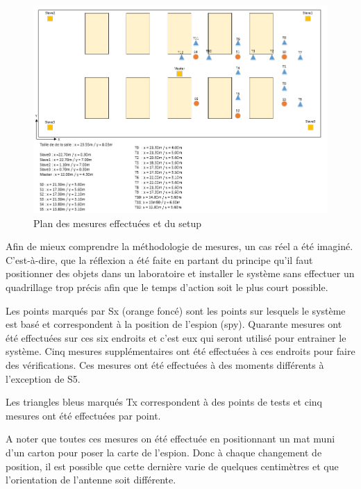 \begin{figure}[htp]
	\begin{center}
		\includegraphics[scale=0.7]{figures/mesures.png}
		\caption{Plan des mesures effectuées et du setup}
		\label{fig:mesures} %
	\end{center}
\end{figure}

Afin de mieux comprendre la méthodologie de mesures, un cas réel a été imaginé. C'est-à-dire, que la réflexion a été faite en partant du principe qu'il faut positionner des objets dans un laboratoire et installer le système sans effectuer un quadrillage trop précis afin que le temps d'action soit le plus court possible. 

Les points marqués par Sx (orange foncé) sont les points sur lesquels le système est basé et correspondent à la position de l'espion (spy). Quarante mesures ont été effectuées sur ces six endroits et c'est eux qui seront utilisé pour entrainer le système. Cinq mesures supplémentaires ont été effectuées à ces endroits pour faire des vérifications. Ces mesures ont été effectuées à des moments différents à l'exception de S5.

Les triangles bleus marqués Tx correspondent à des points de tests et cinq mesures ont été effectuées par point. 

A noter que toutes ces mesures on été effectuée en positionnant un mat muni d'un carton pour poser la carte de l'espion. Donc à chaque changement de position, il est possible que cette dernière varie de quelques centimètres et que l'orientation de l'antenne soit différente. 



